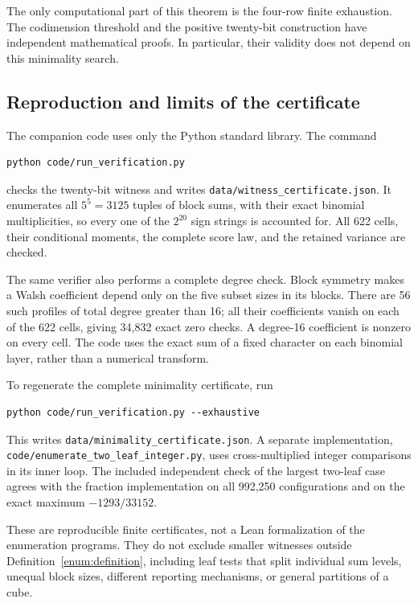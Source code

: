 The only computational part of this theorem is the four-row finite
exhaustion. The codimension threshold and the positive twenty-bit
construction have independent mathematical proofs. In particular,
their validity does not depend on this minimality search.

\subsection{Reproduction and limits of the certificate}

The companion code uses only the Python standard library. The command
\begin{verbatim}
python code/run_verification.py
\end{verbatim}
checks the twenty-bit witness and writes
\texttt{data/witness\_certificate.json}. It enumerates all \(5^5=3125\)
tuples of block sums, with their exact binomial multiplicities, so
every one of the \(2^{20}\) sign strings is accounted for. All 622
cells, their conditional moments, the complete score law, and the
retained variance are checked.

The same verifier also performs a complete degree check. Block symmetry
makes a Walsh coefficient depend only on the five subset sizes in its
blocks. There are 56 such profiles of total degree greater than 16;
all their coefficients vanish on each of the 622 cells, giving 34,832
exact zero checks. A degree-16 coefficient is nonzero on every cell.
The code uses the exact sum of a fixed character on each binomial
layer, rather than a numerical transform.

To regenerate the complete minimality certificate, run
\begin{verbatim}
python code/run_verification.py --exhaustive
\end{verbatim}
This writes \nolinkurl{data/minimality_certificate.json}. A separate
implementation, \nolinkurl{code/enumerate_two_leaf_integer.py},
uses cross-multiplied integer comparisons in its inner loop. The
included independent check of the largest two-leaf case agrees with
the fraction implementation on all 992,250 configurations and on
the exact maximum \(-1293/33152\).

These are reproducible finite certificates, not a Lean formalization
of the enumeration programs. They do not exclude smaller witnesses
outside Definition~\ref{enum:definition}, including leaf tests that
split individual sum levels, unequal block sizes, different reporting
mechanisms, or general partitions of a cube.
